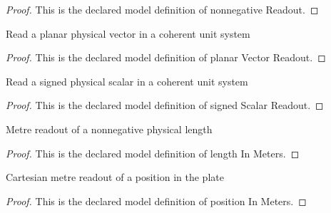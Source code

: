 \begin{proof}
  This is the declared model definition of nonnegative Readout.
\end{proof}
\begin{definition}
  \label{def:physics:phyx-mini-0777:phyxminiproblems-problemphyxmini0777-planarvectorreadout}
  Read a planar physical vector in a coherent unit system
\end{definition}
\begin{proof}
  This is the declared model definition of planar Vector Readout.
\end{proof}
\begin{definition}
  \label{def:physics:phyx-mini-0777:phyxminiproblems-problemphyxmini0777-signedscalarreadout}
  Read a signed physical scalar in a coherent unit system
\end{definition}
\begin{proof}
  This is the declared model definition of signed Scalar Readout.
\end{proof}
\begin{definition}
  \label{def:physics:phyx-mini-0777:phyxminiproblems-problemphyxmini0777-lengthinmeters}
  Metre readout of a nonnegative physical length
\end{definition}
\begin{proof}
  This is the declared model definition of length In Meters.
\end{proof}
\begin{definition}
  \label{def:physics:phyx-mini-0777:phyxminiproblems-problemphyxmini0777-positioninmeters}
  Cartesian metre readout of a position in the plate
\end{definition}
\begin{proof}
  This is the declared model definition of position In Meters.
\end{proof}
